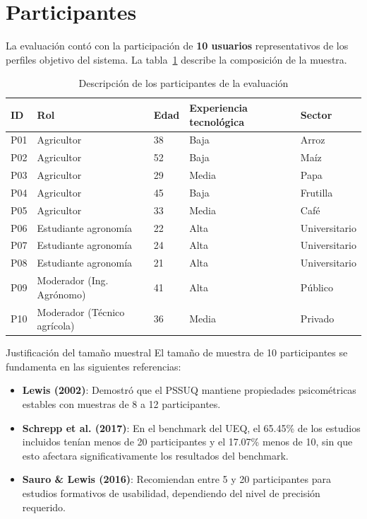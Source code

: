\documentclass[a4paper,12pt]{report}
\begin{document}
\section{Participantes}

La evaluación contó con la participación de \textbf{10 usuarios} representativos de los perfiles objetivo del sistema. La tabla~\ref{tab:participantes} describe la composición de la muestra.

\begin{table}[H]
    \centering
    \caption{Descripción de los participantes de la evaluación}
    \label{tab:participantes}
    \begin{tabular}{p{0.8cm} p{2.8cm} p{2cm} p{2.5cm} p{3cm}}
        \toprule
        \textbf{ID} & \textbf{Rol} & \textbf{Edad} & \textbf{Experiencia tecnológica} & \textbf{Sector} \\
        \midrule
        P01 & Agricultor & 38 & Baja & Arroz \\
        P02 & Agricultor & 52 & Baja & Maíz \\
        P03 & Agricultor & 29 & Media & Papa \\
        P04 & Agricultor & 45 & Baja & Frutilla \\
        P05 & Agricultor & 33 & Media & Café \\
        P06 & Estudiante agronomía & 22 & Alta & Universitario \\
        P07 & Estudiante agronomía & 24 & Alta & Universitario \\
        P08 & Estudiante agronomía & 21 & Alta & Universitario \\
        P09 & Moderador (Ing. Agrónomo) & 41 & Alta & Público \\
        P10 & Moderador (Técnico agrícola) & 36 & Media & Privado \\
        \bottomrule
    \end{tabular}
\end{table}

\begin{principiobox}{Justificación del tamaño muestral}
El tamaño de muestra de 10 participantes se fundamenta en las siguientes referencias:
\begin{itemize}
    \item \textbf{Lewis (2002)}: Demostró que el PSSUQ mantiene propiedades psicométricas estables con muestras de 8 a 12 participantes.
    \item \textbf{Schrepp et al. (2017)}: En el benchmark del UEQ, el 65.45\% de los estudios incluidos tenían menos de 20 participantes y el 17.07\% menos de 10, sin que esto afectara significativamente los resultados del benchmark.
    \item \textbf{Sauro \& Lewis (2016)}: Recomiendan entre 5 y 20 participantes para estudios formativos de usabilidad, dependiendo del nivel de precisión requerido.
\end{itemize}
\end{principiobox}
\end{document}
